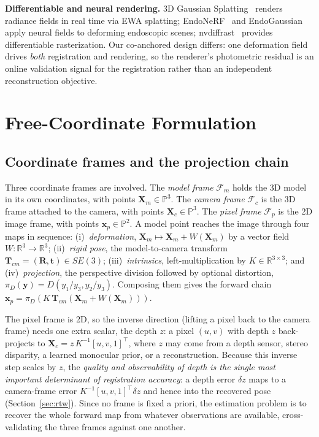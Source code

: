 \documentclass[9pt,twoside,web]{ieeecolor2}
\begin{document}
\textbf{Differentiable and neural rendering.} 3D Gaussian Splatting~\cite{kerbl20233dgs} renders radiance fields in real time via EWA splatting; EndoNeRF~\cite{wang2022endonerf} and EndoGaussian~\cite{zhu2023endogaussian} apply neural fields to deforming endoscopic scenes; nvdiffrast~\cite{laine2020nvdiffrast} provides differentiable rasterization. Our co-anchored design differs: one deformation field drives \emph{both} registration and rendering, so the renderer's photometric residual is an online validation signal for the registration rather than an independent reconstruction objective.

\section{Free-Coordinate Formulation}\label{sec:form}

\subsection{Coordinate frames and the projection chain}
Three coordinate frames are involved. The \emph{model frame} $\mathcal{F}_{m}$ holds the 3D model in its own coordinates, with points $\mathbf{X}_{m}\in\mathbb{P}^{3}$. The \emph{camera frame} $\mathcal{F}_{c}$ is the 3D frame attached to the camera, with points $\mathbf{X}_{c}\in\mathbb{P}^{3}$. The \emph{pixel frame} $\mathcal{F}_{p}$ is the 2D image frame, with points $\mathbf{x}_{p}\in\mathbb{P}^{2}$. A model point reaches the image through four maps in sequence: (i)~\emph{deformation}, $\mathbf{X}_{m}\mapsto\mathbf{X}_{m}+W(\mathbf{X}_{m})$ by a vector field $W:\mathbb{R}^{3}\to\mathbb{R}^{3}$; (ii)~\emph{rigid pose}, the model-to-camera transform $\mathbf{T}_{cm}=(\mathbf{R},\mathbf{t})\in SE(3)$; (iii)~\emph{intrinsics}, left-multiplication by $K\in\mathbb{R}^{3\times3}$; and (iv)~\emph{projection}, the perspective division followed by optional distortion, $\pi_{D}(\mathbf{y})=D(y_{1}/y_{3},y_{2}/y_{3})$. Composing them gives the forward chain $\mathbf{x}_{p}=\pi_{D}(K\,\mathbf{T}_{cm}(\mathbf{X}_{m}+W(\mathbf{X}_{m})))$.

The pixel frame is 2D, so the inverse direction (lifting a pixel back to the camera frame) needs one extra scalar, the depth $z$: a pixel $(u,v)$ with depth $z$ back-projects to $\mathbf{X}_{c}=z\,K^{-1}[u,v,1]^{\top}$, where $z$ may come from a depth sensor, stereo disparity, a learned monocular prior, or a reconstruction. Because this inverse step scales by $z$, the \emph{quality and observability of depth is the single most important determinant of registration accuracy}: a depth error $\delta z$ maps to a camera-frame error $K^{-1}[u,v,1]^{\top}\delta z$ and hence into the recovered pose (Section~\ref{sec:rtw}). Since no frame is fixed a priori, the estimation problem is to recover the whole forward map from whatever observations are available, cross-validating the three frames against one another.
\end{document}
